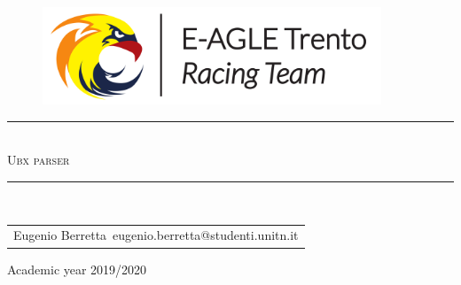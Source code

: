 \pagestyle{plain}

\thispagestyle{empty}

\begin{center}
  \begin{figure}[h!]
    \centerline{\includegraphics[width=0.9\textwidth]{images/Logo_Anteriore.pdf}}
  \end{figure}
    
    \vspace{0.7 cm} 
    
    \rule{\linewidth}{0.2 mm} \\[1 cm]
  
  \Huge\textsc{Ubx parser}
  
  \vspace{0.7 cm} 
  \rule{\linewidth}{0.2 mm} \\[1 cm]
  \vspace{2 cm}
    \begin{center}
        \begin{tabular}{c}
            Eugenio Berretta\
            eugenio.berretta@studenti.unitn.it
        \end{tabular}
    \end{center}

  \vspace{4 cm} 

  \Large{Academic year 2019/2020}
  \\[1cm]
  
\end{center}

